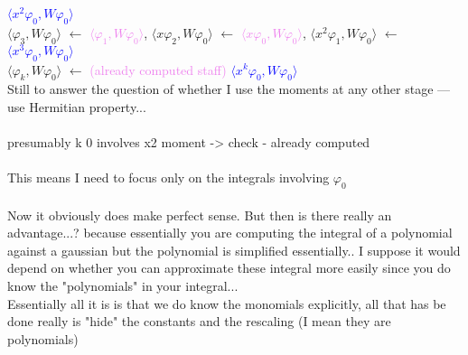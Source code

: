 \textcolor{blue}{$\langle x^2 \varphi_0, W \varphi_0 \rangle$}
\\
$\langle \varphi_3, W \varphi_0 \rangle$ 
$\leftarrow$  
\textcolor{violet}{$\langle \varphi_1, W \varphi_0 \rangle$},
$\langle x \varphi_2, W \varphi_0 \rangle$
$\leftarrow$  
\textcolor{violet}{$\langle x \varphi_0, W \varphi_0 \rangle$},
$\langle x^2 \varphi_1, W \varphi_0 \rangle$
$\leftarrow$  
\textcolor{blue}{$\langle x^3 \varphi_0, W \varphi_0 \rangle$}
\\
$\langle \varphi_k, W \varphi_0 \rangle$ 
$\leftarrow$  
\textcolor{violet}{(already computed staff)}
\textcolor{blue}{$\langle x^k \varphi_0, W \varphi_0 \rangle$}
\\
Still to answer the question of whether I use the moments at 
any other stage --- use Hermitian property...
\\
\\
presumably k 0 involves x2 moment -> check - already computed
\\
\\
This means I need to focus only on the integrals 
involving $\varphi_0$
\\
\\
Now it obviously does make perfect sense. But then is there
really an advantage...? because essentially you are 
computing the integral of a polynomial against a gaussian 
but the polynomial is simplified essentially.. I suppose it 
would depend on whether you can approximate these integral more 
easily since you do know the "polynomials" in your integral...
\\
Essentially all it is is that we do know the monomials explicitly, 
all that has be done really is "hide" the constants and the 
rescaling (I mean they are polynomials)

